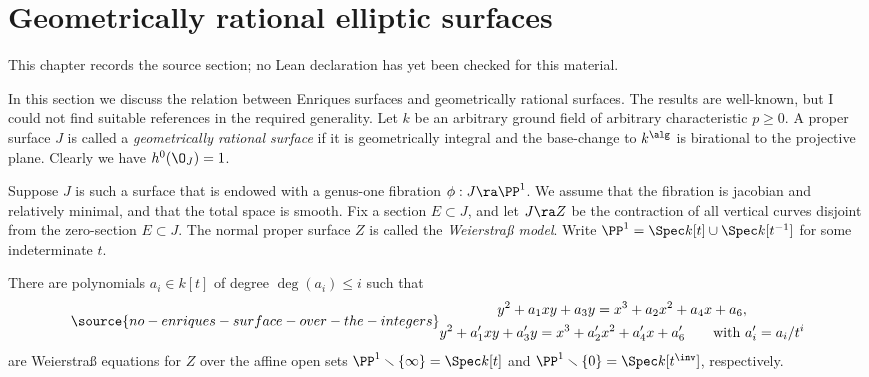 \chapter{Geometrically rational elliptic surfaces}
\label{no-enriques-surface-over-the-integers-chapter-07}

\begin{remark}
\label{no-enriques-surface-over-the-integers-chapter-07-source}
This chapter records the source section; no Lean declaration has yet been checked for this material.
\notready
\end{remark}

\label{Geometrically rational}

In this section we discuss the relation between Enriques surfaces and geometrically rational surfaces.
The results are well-known, but I could not find suitable references in the required generality.
Let $k$ be an arbitrary ground field of arbitrary characteristic $p\geq 0$.
A proper surface $J$ is called a \emph{geometrically rational surface} if it is   geometrically integral and the
base-change to $k^\alg$ is birational to the projective plane. Clearly we have $h^0(\O_J)=1$.

Suppose $J$ is such a surface that is  endowed with a   genus-one fibration $\phi:J\ra \PP^1$.
We assume that the fibration is jacobian and relatively minimal, and that the total space is smooth.
Fix a section $E\subset J$, and let $J\ra Z$ be the contraction of all vertical curves disjoint from the zero-section $E\subset J$.
The normal proper surface $Z$ is called the \emph{Weierstra\ss{} model}.
Write $\PP^1=\Spec k[t]\cup \Spec k[t^{-1}]$ for some indeterminate $t$.


\begin{proposition}
\notready
\label{global weierstrass equations}
There are polynomials $a_i\in k[t]$ of degree $\deg(a_i)\leq i$
such that
\begin{equation}
\label{two equations}
\source{no-enriques-surface-over-the-integers}
\begin{gathered}
y^2+a_1xy+a_3y=x^3+a_2x^2+a_4x+a_6,\\
y^2+a'_1xy+a'_3y=x^3+a'_2x^2+a'_4x+a'_6\qquad \text{with $a_i'=a_i/t^i$}
\end{gathered}
\end{equation}
are  Weierstra\ss{} equations for  $Z$ over the affine open sets $\PP^1\smallsetminus\{\infty\}=\Spec k[t]$
and $\PP^1\smallsetminus \{0\}=\Spec k[t^\inv]$, respectively.
\end{proposition}


